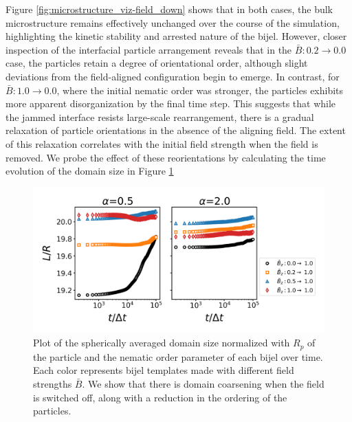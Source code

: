 Figure \ref{fig:microstructure_viz-field_down} shows that in 
both cases, the bulk microstructure remains effectively unchanged over the course of the simulation, highlighting the 
kinetic stability and arrested nature of the bijel.
However, closer inspection of the interfacial particle arrangement reveals that in the
\(\bar{B}: 0.2 \rightarrow 0.0\) case, the particles retain a degree of orientational order, although slight deviations 
from the field-aligned configuration begin to emerge. In contrast, for \(\bar{B}: 1.0 \rightarrow 0.0\), where the 
initial nematic order was stronger, the particles exhibits more apparent disorganization by the final time step. This 
suggests that while the jammed interface resists large-scale rearrangement, there is a gradual relaxation of particle 
orientations in the absence of the aligning field. The extent of this relaxation correlates with the initial field strength when 
the field is removed. We probe the effect of these reorientations by calculating the time evolution of the domain size
in Figure \ref{fig:domain_size-field_down}

\begin{figure} 
\centering 
\includegraphics[scale=0.6]{../figures/results/paper2/domain_size-field_down.png} 
\caption{Plot of the spherically averaged domain size normalized with $R_p$ of the particle and the nematic order parameter of each bijel over time. 
         Each color represents bijel templates made with different field strengths $\bar{B}$. We show that there is domain coarsening when the field 
         is switched off, along with a reduction in the ordering of the particles.} 
\label{fig:domain_size-field_down} 
\end{figure}

